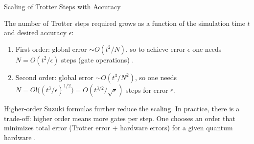 \documentclass{beamer}
\begin{document}
\begin{frame}{Scaling of Trotter Steps with Accuracy}

The number of Trotter steps required grows as a function of the
simulation time $t$ and desired accuracy $\epsilon$: 

\begin{enumerate}
\item First order:
global error $\sim O(t^2/N)$, so to achieve error $\epsilon$ one needs
$N = O(t^2/\epsilon)$ steps (gate operations) .
\item Second order: global
error $\sim O(t^3/N^2)$, so one needs $N =
O!\big((t^3/\epsilon)^{1/2}\big) = O(t^{3/2}/\sqrt{\epsilon})$ steps
for error $\epsilon$.
\end{enumerate}

Higher-order Suzuki formulas further reduce the scaling. In practice,
there is a trade-off: higher order means more gates per step. One
chooses an order that minimizes total error (Trotter error + hardware
errors) for a given quantum hardware . 

\end{frame}
\end{document}
